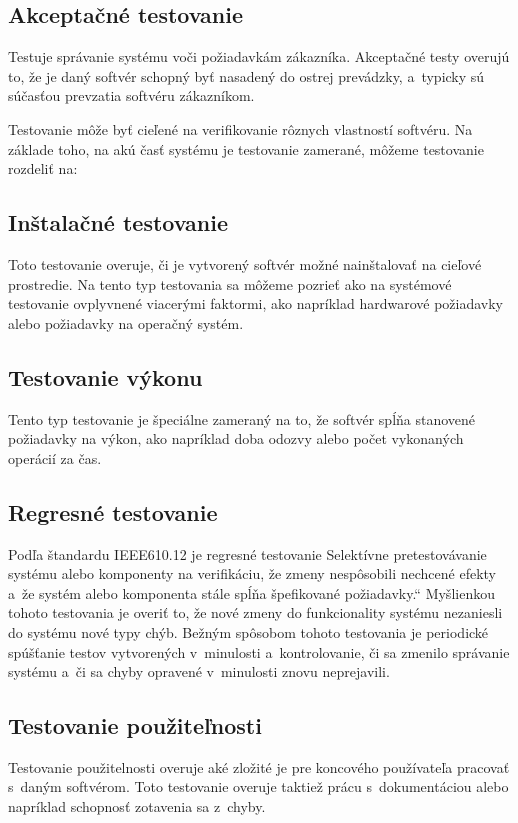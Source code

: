 \subsection*{Akceptačné testovanie}
Testuje správanie systému voči požiadavkám zákazníka. Akceptačné testy overujú to, že je daný softvér 
schopný byť nasadený do ostrej prevádzky, a~typicky sú súčasťou prevzatia softvéru zákazníkom.

Testovanie môže byť cieľené na verifikovanie rôznych vlastností softvéru. Na základe toho, na akú časť systému je 
testovanie zamerané, môžeme testovanie rozdeliť na:
\subsection*{Inštalačné testovanie}
Toto testovanie overuje, či je vytvorený softvér možné nainštalovať
na cieľové prostredie. Na tento typ testovania sa môžeme pozrieť ako na 
systémové testovanie ovplyvnené viacerými faktormi, ako napríklad hardwarové požiadavky
alebo požiadavky na operačný systém. 
\subsection*{Testovanie výkonu}
Tento typ testovanie je špeciálne zameraný na to, že softvér spĺňa stanovené požiadavky 
na výkon, ako napríklad doba odozvy alebo počet vykonaných operácií za čas. 
\subsection*{Regresné testovanie}
Podľa štandardu IEEE610.12 \cite{Ieee_glossary} je regresné testovanie \quotedblbase Selektívne pretestovávanie 
systému alebo komponenty na verifikáciu, že zmeny nespôsobili nechcené efekty a~že systém alebo
komponenta stále spĺňa špefikované požiadavky.\textquotedblleft
Myšlienkou tohoto testovania je overiť to, že nové zmeny do funkcionality systému nezaniesli do systému nové typy chýb.
Bežným spôsobom tohoto testovania je periodické spúšťanie testov vytvorených v~minulosti a~kontrolovanie, či sa zmenilo správanie
systému a~či sa chyby opravené v~minulosti znovu neprejavili.
\subsection*{Testovanie použiteľnosti}
Testovanie použitelnosti overuje aké zložité je pre koncového používateľa pracovať s~daným softvérom.
Toto testovanie overuje taktiež prácu s~dokumentáciou alebo napríklad schopnosť zotavenia sa z~chyby. 

